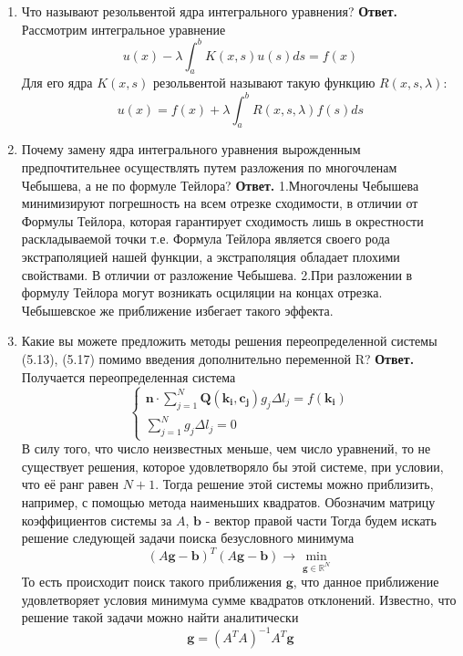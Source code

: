 \documentclass{article}
\begin{document}
\begin{enumerate}
		\item Что называют резольвентой ядра интегрального уравнения?
		\newline 
		{\bfseries Ответ. } 
		Рассмотрим интегральное уравнение 
		\begin{equation*}
			u(x) - \lambda \int_{a}^{b} K(x, s) u(s)ds = f(x)
		\end{equation*}
		Для его ядра $K(x,s)$ резольвентой называют такую функцию $R(x, s, \lambda)$:
		\begin{equation*}
			u(x)= f(x) + \lambda \int_{a}^{b} R(x, s, \lambda) f(s)ds
		\end{equation*} 
		\item Почему замену ядра интегрального уравнения вырожденным предпочтительнее осуществлять путем разложения по
		многочленам Чебышева, а не по формуле Тейлора?
		\newline 
		{\bfseries Ответ. } 
		\newline
		1.Многочлены Чебышева минимизируют погрешность на всем отрезке сходимости, в отличии от Формулы Тейлора, которая гарантирует сходимость лишь в окрестности раскладываемой точки т.е. Формула Тейлора является своего рода экстраполяцией нашей функции, а экстраполяция обладает плохими свойствами. В отличии от разложение Чебышева.
		\newline
		2.При разложении в формулу Тейлора могут возникать осциляции на концах отрезка. Чебышевское же приближение избегает такого эффекта.
		\item Какие вы можете предложить методы решения переопределенной системы (5.13), (5.17) помимо введения дополнительно переменной R?
		\newline 
		{\bfseries Ответ. } 
		Получается переопределенная система
		\begin{equation*}
			\begin{cases}
				\mathbf{n} \cdot  \sum_{j=1}^N \mathbf{Q}(\mathbf{k_i}, \mathbf{c_j}) g_j \Delta l_j = f(\mathbf{k_i}) \\ 
				\sum_{j=1}^{N} g_j \Delta l_j = 0
			\end{cases}
		\end{equation*}
		В силу того, что число неизвестных меньше, чем число уравнений, то не существует решения, 
		которое удовлетворяло бы этой системе, при условии, что её ранг равен $N+1$.
		Тогда решение этой системы можно приблизить, например, с помощью метода наименьших 
		квадратов. 
		Обозначим матрицу коэффициентов системы за $A$, $\mathbf{b}$ - вектор правой части
		Тогда будем искать решение следующей задачи поиска безусловного минимума 
		\begin{equation*}
			(A \mathbf{g} - \mathbf{b})^T (A \mathbf{g} - \mathbf{b})\to \min\limits_{\mathbf{g} \in \mathbb{R}^{N}}
		\end{equation*}
		То есть происходит поиск такого приближения $\mathbf{g}$, что 
		данное приближение удовлетворяет условия минимума сумме квадратов отклонений.
		Известно, что решение такой задачи можно найти аналитически 
		\begin{equation*}
			\mathbf{g} = (A^T A )^{-1}A^T \mathbf{g	}
		\end{equation*}
	\end{enumerate}
\end{document}
